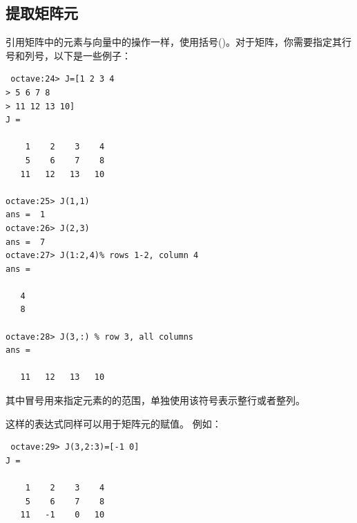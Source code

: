 \documentclass[UTF8,adobefonts]{ctexart}
\begin{document}
\subsection{提取矩阵元}
引用矩阵中的元素与向量中的操作一样，使用括号()。对于矩阵，你需要指定其行号和列号，以下是一些例子：
\begin{verbatim}
 octave:24> J=[1 2 3 4
> 5 6 7 8
> 11 12 13 10]
J =

    1    2    3    4
    5    6    7    8
   11   12   13   10

octave:25> J(1,1)
ans =  1
octave:26> J(2,3)
ans =  7
octave:27> J(1:2,4)% rows 1-2, column 4
ans =

   4
   8

octave:28> J(3,:) % row 3, all columns
ans =

   11   12   13   10
\end{verbatim}
其中冒号用来指定元素的的范围，单独使用该符号表示整行或者整列。

这样的表达式同样可以用于矩阵元的赋值。
例如：
\begin{verbatim}
 octave:29> J(3,2:3)=[-1 0]
J =

    1    2    3    4
    5    6    7    8
   11   -1    0   10

\end{verbatim}

\end{document}
